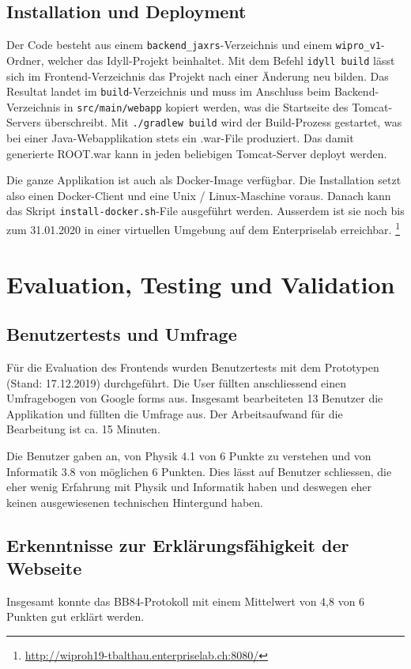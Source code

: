 \documentclass[a4paper,10.2pt,pdftex]{scrartcl}%
\begin{document}
\subsection{Installation und Deployment}
Der Code besteht aus einem \texttt{backend\_jaxrs}-Verzeichnis und einem \texttt{wipro\_v1}-Ordner, welcher das Idyll-Projekt beinhaltet. Mit dem Befehl \texttt{idyll build} lässt sich im Frontend-Verzeichnis das Projekt nach einer Änderung neu bilden. Das Resultat landet im \texttt{build}-Verzeichnis und muss im Anschluss beim Backend-Verzeichnis in \texttt{src/main/webapp} kopiert werden, was die Startseite des Tomcat-Servers überschreibt. Mit \texttt{./gradlew build} wird der Build-Prozess gestartet, was bei einer Java-Webapplikation stets ein .war-File produziert. Das damit generierte ROOT.war kann in jeden beliebigen Tomcat-Server deployt werden. 

Die ganze Applikation ist auch als Docker-Image verfügbar. Die Installation setzt also einen Docker-Client und eine Unix / Linux-Maschine voraus. Danach kann das Skript \texttt{install-docker.sh}-File ausgeführt werden.  Ausserdem ist sie noch bis zum 31.01.2020 in einer virtuellen Umgebung auf dem Enterpriselab erreichbar. \footnote{\url{http://wiproh19-tbalthau.enterpriselab.ch:8080/}}

\section{Evaluation, Testing und Validation}
\subsection{Benutzertests und Umfrage}
Für die Evaluation des Frontends wurden Benutzertests mit dem Prototypen (Stand: 17.12.2019) durchgeführt. Die User füllten anschliessend einen Umfragebogen von Google forms aus. Insgesamt bearbeiteten 13 Benutzer die Applikation und füllten die Umfrage aus. Der Arbeitsaufwand für die Bearbeitung ist ca. 15 Minuten.

Die Benutzer gaben an, von Physik 4.1 von 6 Punkte zu verstehen und von Informatik 3.8 von möglichen 6 Punkten. Dies lässt auf Benutzer schliessen, die eher wenig Erfahrung mit Physik und Informatik haben und deswegen eher keinen ausgewiesenen technischen Hintergund haben.
\subsection{Erkenntnisse zur Erklärungsfähigkeit der Webseite}
Insgesamt konnte das BB84-Protokoll mit einem Mittelwert von 4,8 von 6 Punkten gut erklärt werden. 
\end{document}
